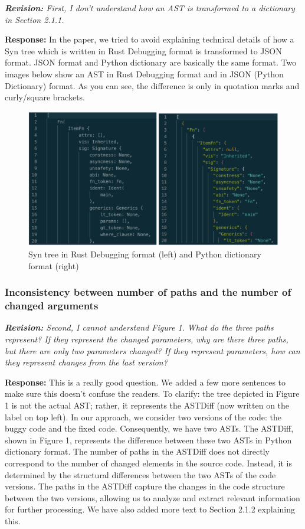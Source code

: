 \documentclass{article}
\begin{document}
\textit{\textbf{Revision:} First, I don't understand how an AST is transformed to a dictionary in Section 2.1.1.}

\textbf{Response:} In the paper, we tried to avoid explaining technical details of how a Syn tree which is written in Rust Debugging format is transformed to JSON format. JSON format and Python dictionary are basically the same format. Two images below show an AST in Rust Debugging format and in JSON (Python Dictionary) format. As you can see, the difference is only in quotation marks and curly/square brackets.

\begin{figure}[h]
    \centering
    \includegraphics[width=1\textwidth]{astpics}
    \caption{Syn tree in Rust Debugging format (left) and Python dictionary format (right)}
\end{figure}

\subsubsection{Inconsistency between number of paths and the number of changed arguments}

\textit{\textbf{Revision:} Second, I cannot understand Figure 1. What do the three paths represent? If they represent the changed parameters, why are there three paths, but there are only two parameters changed? If they represent parameters, how can they represent changes from the last version?}

\textbf{Response:} This is a really good question. We added a few more sentences to make sure this doesn't confuse the readers. To clarify: the tree depicted in Figure 1 is not the actual AST; rather, it represents the ASTDiff (now written on the label on top left). In our approach, we consider two versions of the code: the buggy code and the fixed code. Consequently, we have two ASTs. The ASTDiff, shown in Figure 1, represents the difference between these two ASTs in Python dictionary format. The number of paths in the ASTDiff does not directly correspond to the number of changed elements in the source code. Instead, it is determined by the structural differences between the two ASTs of the code versions. The paths in the ASTDiff capture the changes in the code structure between the two versions, allowing us to analyze and extract relevant information for further processing. We have also added more text to Section 2.1.2 explaining this.
\end{document}
